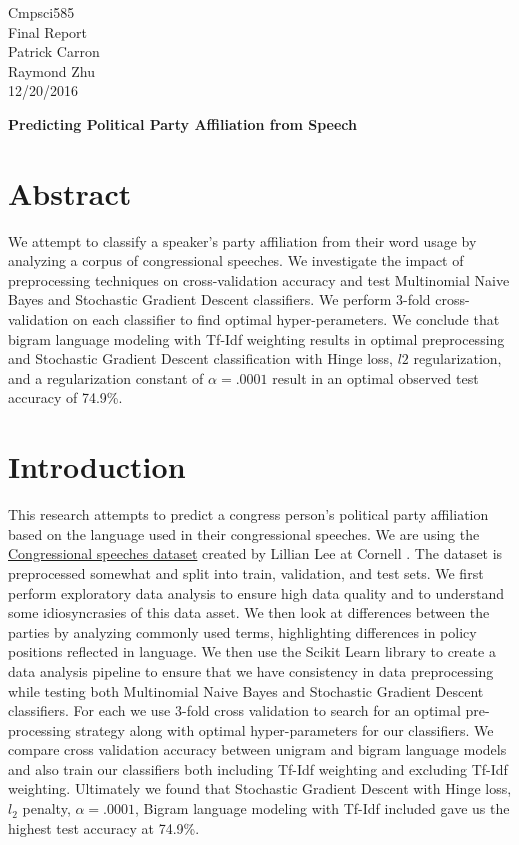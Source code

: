 \documentclass[a4paper, 12pt]{article}
\begin{document}
\noindent
Cmpsci585\\
Final Report\\
Patrick Carron \\
Raymond Zhu\\
12/20/2016 \\
\begin{center}

\textbf{Predicting Political Party Affiliation from Speech}
\end{center}

\section{Abstract}
We attempt to classify a speaker's party affiliation from their word usage by analyzing a corpus of congressional speeches.  We investigate the impact of preprocessing techniques on cross-validation accuracy and test Multinomial Naive Bayes and Stochastic Gradient Descent classifiers. We perform 3-fold cross-validation on each classifier to find optimal hyper-perameters. We conclude that bigram language modeling with Tf-Idf weighting results in optimal preprocessing and Stochastic Gradient Descent classification with Hinge loss, $l2$ regularization, and a regularization constant  of $\alpha=.0001$ result in an optimal observed test accuracy of 74.9\%.
	
	\section{Introduction}
	
	This research attempts to predict a congress person's political party affiliation based on the language used in their congressional speeches. We are using the \href{http://www.cs.cornell.edu/home/llee/data/convote.html}{Congressional speeches dataset} created by Lillian Lee at Cornell \cite{thomas2006get}. The dataset is preprocessed somewhat and split into train, validation, and test sets.  We first perform exploratory data analysis to ensure high data quality and to understand some idiosyncrasies of this data asset. We then look at differences between the parties by analyzing commonly used terms, highlighting differences in policy positions reflected in language. We then use the \cite{pedregosa2011scikit} Scikit Learn library to create a data analysis pipeline to ensure that we have consistency in data preprocessing while testing both Multinomial Naive Bayes and Stochastic Gradient Descent classifiers.  For each we use 3-fold cross validation to search for an optimal pre-processing strategy along with optimal hyper-parameters for our classifiers.  We compare cross validation accuracy between unigram and bigram language models and also train our classifiers both including Tf-Idf weighting and excluding Tf-Idf weighting. Ultimately we found that Stochastic Gradient Descent with Hinge loss, $l_2$ penalty, $\alpha=.0001$,  Bigram language modeling with Tf-Idf included gave us the highest test accuracy at 74.9\%.
	
\end{document}
